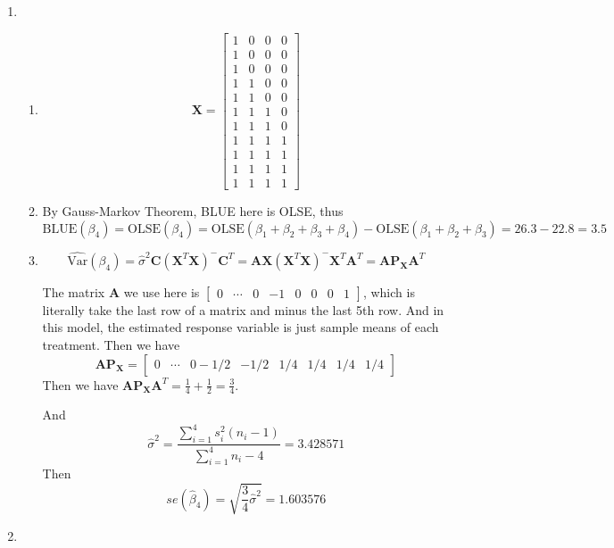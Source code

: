 \documentclass{article}
\begin{document}
\begin{enumerate}[leftmargin = 0 em, label = \arabic*., font = \bfseries]
	\item 
	\begin{enumerate}
		\item 
		\[\bm X = \begin{bmatrix}
			1 & 0 & 0& 0\\
			1 & 0 & 0& 0\\
			1 & 0 & 0& 0\\
			1 & 1 & 0& 0\\
			1 & 1 & 0& 0\\
			1 & 1 & 1& 0\\
			1 & 1 & 1& 0\\
			1 & 1 & 1& 1\\
			1 & 1 & 1& 1\\
			1 & 1 & 1& 1\\
			1 & 1 & 1& 1
		\end{bmatrix}\]


		\item 
		By Gauss-Markov Theorem, BLUE here is OLSE, thus
		\[\mathrm{BLUE}(\beta_4)  = \mathrm{OLSE}(\beta_4) = \mathrm{OLSE}(\beta_1 + \beta_2 + \beta_3 + \beta_4) - \mathrm{OLSE}(\beta_1 + \beta_2 + \beta_3) = 26.3 - 22.8 = 3.5\]

		\item 
		\[\hat{\mathrm{Var}}(\beta_4) = \hat{\sigma}^2 \bm C (\bm X^T \bm X)^{-} \bm C^T = \bm A \bm X (\bm X^T \bm X)^{-} \bm X^T \bm A^T = \bm A \bm P_{\bm X} \bm A^T\]

		The matrix $\bm A$ we use here is $\begin{bmatrix}
			0 & \cdots & 0 & -1 & 0 & 0 & 0 & 1
		\end{bmatrix}$, which is literally take the last row of a matrix and minus the last 5th row. And in this model, the estimated response variable is just sample means of each treatment. Then we have
		\[\bm A \bm P_{\bm X} = \begin{bmatrix}
			0 & \cdots & 0 -1/2 & -1/2 & 1/4 & 1/4 & 1/4 & 1/4
		\end{bmatrix}\]
		Then we have $\bm A \bm P_{\bm X} \bm A^T = \frac{1}{4} + \frac{1}{2} = \frac{3}{4}$.

		And 
		\[\hat{\sigma}^2 = \frac{\sum_{i=1}^4 {s_i^2} (n_i - 1)}{\sum_{i=1}^4 {n_i} - 4} = 3.428571\]
		Then 
		\[se(\hat{\beta}_{4}) =  \sqrt{\frac{3}{4} \hat{\sigma}^2} = 1.603576\]
	\end{enumerate}

	\item 
	\begin{enumerate}
	

\end{enumerate}
\end{enumerate}
\end{document}
